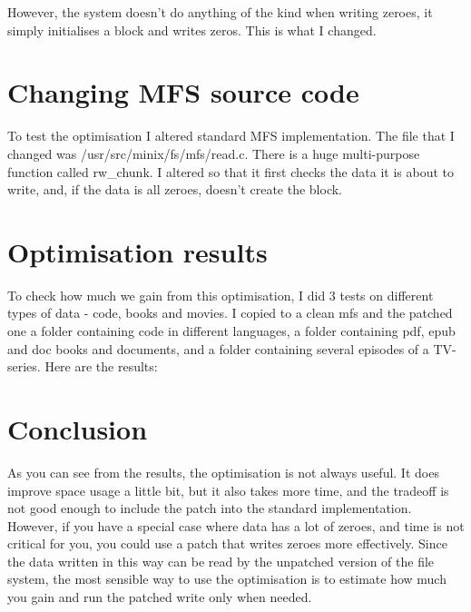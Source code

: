 \documentclass{sig-alternate-05-2015}
\begin{document}
However, the system doesn't do anything of the kind when 
writing zeroes, it simply initialises a block and writes zeros. 
This is what I changed.

\section{Changing MFS source code}

To test the optimisation I altered standard MFS implementation.
The file that I changed was /usr/src/minix/fs/mfs/read.c.
There is a huge multi-purpose function called rw\_chunk. I altered so that
it first checks the data it is about to write, and, if the data is all zeroes,
doesn't create the block.

\section{Optimisation results}

To check how much we gain from this optimisation, I did 3 tests on different types of data -
code, books and movies. I copied to a clean mfs and the patched one a folder containing code in
different languages, a folder containing pdf, epub and doc books and documents, and a folder 
containing several episodes of a TV-series. Here are the results:

\section{Conclusion}

As you can see from the results, the optimisation is not always useful.
It does improve space usage a little bit, but it also takes more time, and the tradeoff is
not good enough to include the patch into the standard implementation.
However, if you have a special case where data
has a lot of zeroes, and time is not critical for you, you could use a patch that writes zeroes
more effectively. Since the data written in this way can be read by the unpatched version of the 
file system, the most sensible way to use the optimisation is 
to estimate how much you gain and run the patched write only when needed.



\end{document}
